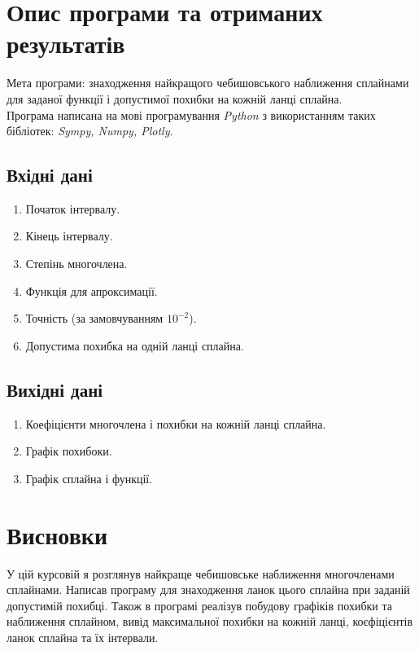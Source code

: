 \documentclass[ukrainian,14pt]{extarticle}
\begin{document}
\newpage
\section{Опис програми та отриманих результатів}
Мета програми: знаходження найкращого чебишовського наближення сплайнами для заданої функції і допустимої похибки на кожній ланці сплайна. \\
Програма написана на мові програмування \emph{Python} з використанням таких бібліотек: \emph{Sympy, Numpy, Plotly}.
\subsection{Вхідні дані}

\begin{enumerate}
\item Початок інтервалу.
\item Кінець інтервалу.
\item Степінь многочлена.
\item Функція для апроксимації.
\item Точність (за замовчуванням $10^{-2}$).
\item Допустима похибка на одній ланці сплайна.
\end{enumerate}

\subsection{Вихідні дані}

\begin{enumerate}
\item Коефіцієнти многочлена і похибки на кожній ланці сплайна.
\item Графік похибоки.
\item Графік сплайна і функції.

\end{enumerate}
\newpage

\newpage

\section*{Висновки}
У цій курсовій я розглянув найкраще чебишовське наближення многочленами сплайнами. Написав програму для знаходження ланок цього сплайна при заданій допустимій похибці. Також в програмі реалізув побудову графіків похибки та наближення сплайном, вивід максимальної похибки на кожній ланці, коєфіцієнтів ланок сплайна та їх інтервали.
\end{document}
